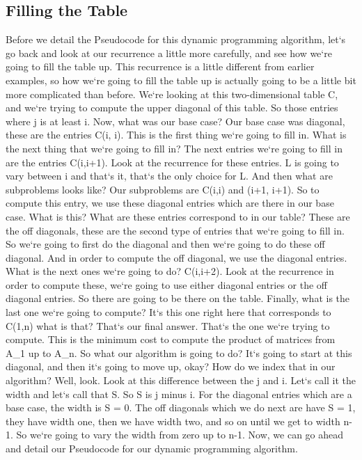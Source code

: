 \subsection{Filling the Table}
Before we detail the Pseudocode for this dynamic programming algorithm, let`s go back and look at our recurrence a little more carefully, and see how we`re going to fill the table up.
This recurrence is a little different from earlier examples, so how we`re going to fill the table up is actually going to be a little bit more complicated than before.
We`re looking at this two-dimensional table C, and we`re trying to compute the upper diagonal of this table.
So those entries where j is at least i.
Now, what was our base case? Our base case was diagonal, these are the entries C(i, i).
This is the first thing we`re going to fill in.
What is the next thing that we`re going to fill in? The next entries we`re going to fill in are the entries C(i,i+1).
Look at the recurrence for these entries.
L is going to vary between i and that`s it, that`s the only choice for L\@.
And then what are subproblems looks like? Our subproblems are C(i,i) and (i+1, i+1).
So to compute this entry, we use these diagonal entries which are there in our base case.
What is this? What are these entries correspond to in our table? These are the off diagonals, these are the second type of entries that we`re going to fill in.
So we`re going to first do the diagonal and then we`re going to do these off diagonal.
And in order to compute the off diagonal, we use the diagonal entries.
What is the next ones we`re going to do? C(i,i+2).
Look at the recurrence in order to compute these, we`re going to use either diagonal entries or the off diagonal entries.
So there are going to be there on the table.
Finally, what is the last one we`re going to compute? It`s this one right here that corresponds to C(1,n) what is that? That`s our final answer.
That`s the one we`re trying to compute.
This is the minimum cost to compute the product of matrices from A\_1 up to A\_n.
So what our algorithm is going to do? It`s going to start at this diagonal, and then it`s going to move up, okay? How do we index that in our algorithm? Well, look.
Look at this difference between the j and i.
Let`s call it the width and let`s call that S\@.
So S is j minus i.
For the diagonal entries which are a base case, the width is S = 0.
The off diagonals which we do next are have S = 1, they have width one, then we have width two, and so on until we get to width n-1.
So we`re going to vary the width from zero up to n-1.
Now, we can go ahead and detail our Pseudocode for our dynamic programming algorithm.

